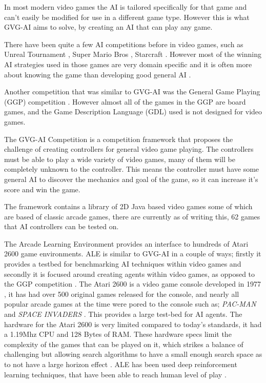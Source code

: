 \documentclass[journal]{IEEEtran}
\begin{document}
		In most modern video games the AI is tailored specifically for that game and can't easily be modified for use in a different game type. However this is what GVG-AI aims to solve, by creating an AI that can play any game. 
		
		There have been quite a few AI competitions before in video games, such as Unreal Tournament \cite{hingston2010new}, Super Mario Bros \cite{shaker2013turing}, Starcraft \cite{ontanon2013survey}. 
		However most of the winning AI strategies used in those games are very domain specific and it is often more about knowing the game than developing good general AI \cite{perez20162014}. 
		 \par
		
		
		Another competition that was similar to GVG-AI was the General Game Playing (GGP) competition \cite{GGP2005general, love2008general}. However almost all of the games in the GGP are board games, and the Game Description Language (GDL) used is not designed for video games.
		
		The GVG-AI Competition is a competition framework that proposes the challenge of creating controllers for general video game playing. The controllers must be able to play a wide variety of video games, many of them will be completely unknown to the controller. This means the controller must have some general AI to discover the mechanics and goal of the game, so it can increase it's score and win the game. \cite{GVGAI, perez20162014}
		
		The framework contains a library of 2D Java based video games some of which are based of classic arcade games, there are currently as of writing this, 62 games that AI controllers can be tested on.

		The Arcade Learning Environment \cite{bellemare2013arcade} provides an interface to hundreds of Atari 2600 game environments. ALE is similar to GVG-AI in a couple of ways; firstly it provides a testbed for benchmarking AI techniques within video games and secondly it is focused around creating agents within video games, as opposed to the GGP competition \cite{GGP2005general}.
		The Atari 2600 is a video game console developed in 1977 , it has had over 500 original games released for the console, and nearly all popular arcade games at the time were pored to the console such as; \textit{PAC-MAN} and \textit{SPACE INVADERS} \cite{bellemare2013arcade}. This provides a large test-bed for AI agents.
		The hardware for the Atari 2600 is very limited compared to today's standards, it had a 1.19Mhz CPU and 128 Bytes of RAM. These hardware specs limit the complexity of the games that can be played on it, which strikes a balance of challenging but allowing search algorithms to have a small enough search space as to not have a large horizon effect \cite{bellemare2013arcade}.
		ALE has been used deep reinforcement learning techniques, that have been able to reach human level of play \cite{mnih2015human, gaina2017rolling}.
		
\end{document}
